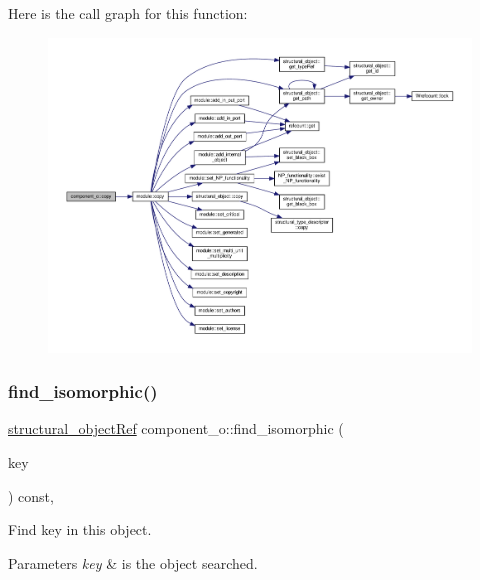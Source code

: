 Here is the call graph for this function\+:
\nopagebreak
\begin{figure}[H]
\begin{center}
\leavevmode
\includegraphics[width=350pt]{de/d6c/classcomponent__o_abdd94a898eec3592371908dbe9ade6b4_cgraph}
\end{center}
\end{figure}
\mbox{\label{classcomponent__o_a8bb03d2af520a73c01e330f137fd9fd4}} 
\subsubsection{\texorpdfstring{find\+\_\+isomorphic()}{find\_isomorphic()}}
{\footnotesize\ttfamily \hyperlink{structural__objects_8hpp_a8ea5f8cc50ab8f4c31e2751074ff60b2}{structural\+\_\+object\+Ref} component\+\_\+o\+::find\+\_\+isomorphic (\begin{DoxyParamCaption}\item[{const \hyperlink{structural__objects_8hpp_a8ea5f8cc50ab8f4c31e2751074ff60b2}{structural\+\_\+object\+Ref}}]{key }\end{DoxyParamCaption}) const\hspace{0.3cm}{\ttfamily [override]}, {\ttfamily [virtual]}}



Find key in this object. 


\begin{DoxyParams}{Parameters}
{\em key} & is the object searched. \\
\hline
\end{DoxyParams}


